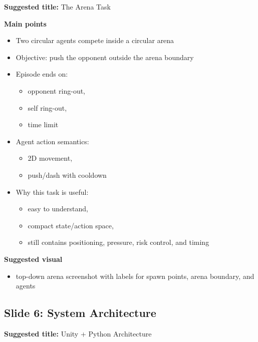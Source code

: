 \documentclass[11pt]{article}
\begin{document}
\textbf{Suggested title:} The Arena Task

\textbf{Main points}
\begin{itemize}
    \item Two circular agents compete inside a circular arena
    \item Objective: push the opponent outside the arena boundary
    \item Episode ends on:
    \begin{itemize}
        \item opponent ring-out,
        \item self ring-out,
        \item time limit
    \end{itemize}
    \item Agent action semantics:
    \begin{itemize}
        \item 2D movement,
        \item push/dash with cooldown
    \end{itemize}
    \item Why this task is useful:
    \begin{itemize}
        \item easy to understand,
        \item compact state/action space,
        \item still contains positioning, pressure, risk control, and timing
    \end{itemize}
\end{itemize}

\textbf{Suggested visual}
\begin{itemize}
    \item top-down arena screenshot with labels for spawn points, arena boundary, and agents
\end{itemize}

\subsection*{Slide 6: System Architecture}

\textbf{Suggested title:} Unity + Python Architecture
\end{document}
